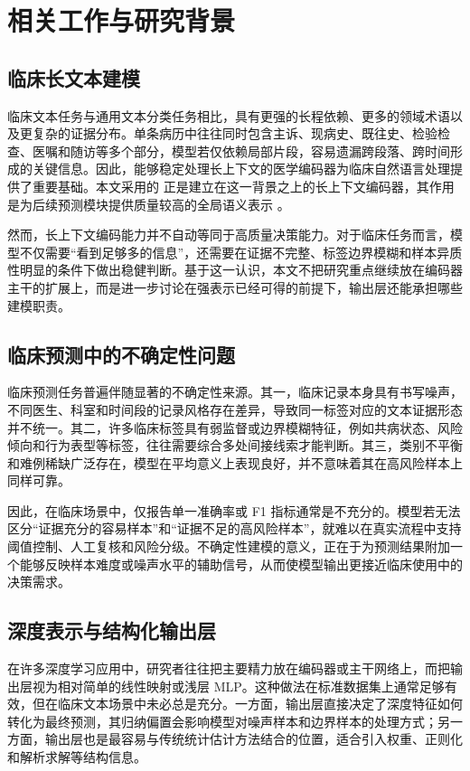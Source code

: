 \section{相关工作与研究背景}
\subsection{临床长文本建模}
临床文本任务与通用文本分类任务相比，具有更强的长程依赖、更多的领域术语以及更复杂的证据分布。单条病历中往往同时包含主诉、现病史、既往史、检验检查、医嘱和随访等多个部分，模型若仅依赖局部片段，容易遗漏跨段落、跨时间形成的关键信息。因此，能够稳定处理长上下文的医学编码器为临床自然语言处理提供了重要基础。本文采用的 \encoder{} 正是建立在这一背景之上的长上下文编码器，其作用是为后续预测模块提供质量较高的全局语义表示 \citep{sounack2025bioclinicalmodernbertstateoftheartlongcontext}。

然而，长上下文编码能力并不自动等同于高质量决策能力。对于临床任务而言，模型不仅需要“看到足够多的信息”，还需要在证据不完整、标签边界模糊和样本异质性明显的条件下做出稳健判断。基于这一认识，本文不把研究重点继续放在编码器主干的扩展上，而是进一步讨论在强表示已经可得的前提下，输出层还能承担哪些建模职责。

\subsection{临床预测中的不确定性问题}
临床预测任务普遍伴随显著的不确定性来源。其一，临床记录本身具有书写噪声，不同医生、科室和时间段的记录风格存在差异，导致同一标签对应的文本证据形态并不统一。其二，许多临床标签具有弱监督或边界模糊特征，例如共病状态、风险倾向和行为表型等标签，往往需要综合多处间接线索才能判断。其三，类别不平衡和难例稀缺广泛存在，模型在平均意义上表现良好，并不意味着其在高风险样本上同样可靠。

因此，在临床场景中，仅报告单一准确率或 F1 指标通常是不充分的。模型若无法区分“证据充分的容易样本”和“证据不足的高风险样本”，就难以在真实流程中支持阈值控制、人工复核和风险分级。不确定性建模的意义，正在于为预测结果附加一个能够反映样本难度或噪声水平的辅助信号，从而使模型输出更接近临床使用中的决策需求。

\subsection{深度表示与结构化输出层}
在许多深度学习应用中，研究者往往把主要精力放在编码器或主干网络上，而把输出层视为相对简单的线性映射或浅层 MLP。这种做法在标准数据集上通常足够有效，但在临床文本场景中未必总是充分。一方面，输出层直接决定了深度特征如何转化为最终预测，其归纳偏置会影响模型对噪声样本和边界样本的处理方式；另一方面，输出层也是最容易与传统统计估计方法结合的位置，适合引入权重、正则化和解析求解等结构信息。

